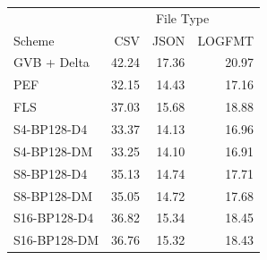 \begin{tabular}{lrrr}
\toprule
 & \multicolumn{3}{c}{File Type} \\
Scheme & CSV & JSON & LOGFMT \\
\midrule
GVB + Delta & 42.24 & 17.36 & 20.97 \\
PEF & 32.15 & 14.43 & 17.16 \\
FLS & 37.03 & 15.68 & 18.88 \\
S4-BP128-D4 & 33.37 & 14.13 & 16.96 \\
S4-BP128-DM & 33.25 & 14.10 & 16.91 \\
S8-BP128-D4 & 35.13 & 14.74 & 17.71 \\
S8-BP128-DM & 35.05 & 14.72 & 17.68 \\
S16-BP128-D4 & 36.82 & 15.34 & 18.45 \\
S16-BP128-DM & 36.76 & 15.32 & 18.43 \\
\bottomrule
\end{tabular}
